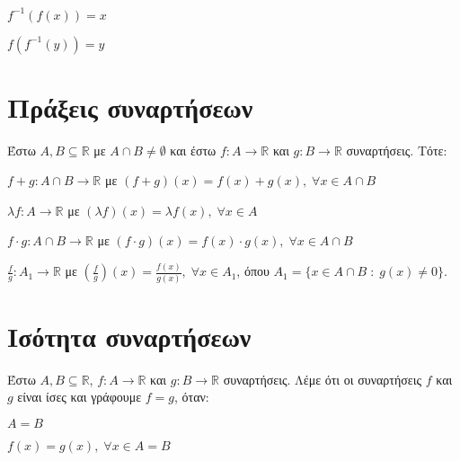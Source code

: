\begin{prop}[Ιδιότητες]
\item {}
  \begin{myitemize}
    \item $ f^{-1}(f(x))= x $
    \item $ f(f^{-1}(y))= y $
  \end{myitemize}
\end{prop}


\section{Πράξεις συναρτήσεων}

\begin{dfn}
  Έστω $ A, B \subseteq \mathbb{R} $ με $ A \cap B \neq \emptyset $ και έστω $ f
  \colon A \to \mathbb{R} $ και $ g \colon B \to \mathbb{R} $ συναρτήσεις. Τότε:
  \begin{myitemize}
    \item $ f+g \colon A \cap B \to \mathbb{R} $ με 
      $ (f+g)(x)= f(x)+g(x), \; \forall x \in A \cap B $
    \item $ \lambda f \colon A \to \mathbb{R} $ με 
      $ (\lambda f)(x)= \lambda f(x), \; \forall x \in A $
    \item $ f\cdot g \colon A \cap B \to \mathbb{R} $ με 
      $ (f\cdot g)(x)= f(x)\cdot g(x), \; \forall x \in A \cap B $
    \item  $ \frac{f}{g} \colon A_{1} \to \mathbb{R} $ με 
      $ \left(\frac{f}{g}\right)(x)= \frac{f(x)}{g(x)}, \; \forall x \in A_{1} $,
      όπου $ A_{1} = \{ x \in A \cap B \; : \; g(x) \neq 0 \} $.
  \end{myitemize}
\end{dfn}

\section{Ισότητα συναρτήσεων}

\begin{dfn}
  Έστω $ A, B \subseteq \mathbb{R} $, $ f \colon A \to \mathbb{R} $ και 
  $ g \colon B \to \mathbb{R} $ συναρτήσεις. Λέμε ότι οι συναρτήσεις $f$ και $g$ είναι
  ίσες και γράφουμε $ f=g $, όταν: 
  \begin{myitemize}
    \item $ A=B $
    \item $f(x) = g(x), \; \forall x \in A = B $
  \end{myitemize}
\end{dfn}

